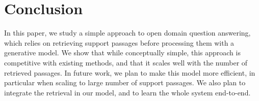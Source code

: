 \documentclass[11pt,a4paper]{article}
\begin{document}
\section{Conclusion}
In this paper, we study a simple approach to open domain question answering, which relies on retrieving support passages before processing them with a generative model.
We show that while conceptually simple, this approach is competitive with existing methods, and that it scales well with the number of retrieved passages.
In future work, we plan to make this model more efficient, in particular when scaling to large number of support passages.
We also plan to integrate the retrieval in our model, and to learn the whole system end-to-end.
 


\end{document}
